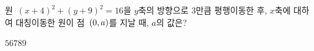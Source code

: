 원~$(x+4)^2+(y+9)^2=16$을 $y$축의 방향으로 $3$만큼 평행이동한 후, $x$축에 대하여 대칭이동한 원이 점~$(0{,}\mkern3mu a)$를 지날 때, $a$의 값은?
\begin{choices32}{$5$}{$6$}{$7$}{$8$}{$9$}\end{choices32}
